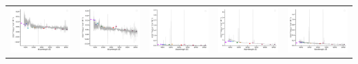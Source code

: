 \begin{center}
\begin{longtable}{l l l l l }
    \includegraphics[width=0.2\linewidth, clip]{Figs/Figs-sdss/spec-0514-51994-0016-SPLUS-n02n21-042463.pdf} & \includegraphics[width=0.2\linewidth, clip]{Figs/Figs-sdss/spec-0515-52051-0011-SPLUS-n02n22-059209.pdf} & \includegraphics[width=0.2\linewidth, clip]{Figs/Figs-sdss/spec-0519-52283-0278-SPLUS-n02n26-032045.pdf} & \includegraphics[width=0.2\linewidth, clip]{Figs/Figs-sdss/spec-0519-52283-0291-SPLUS-n02n26-039812.pdf} & \includegraphics[width=0.2\linewidth, clip]{Figs/Figs-sdss/spec-0520-52288-0312-SPLUS-n02n28-039381.pdf} \\

\end{longtable}
\end{center}
